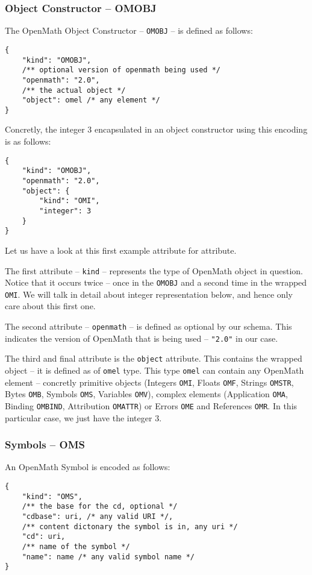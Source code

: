 \subsubsection{Object Constructor -- OMOBJ}

The OpenMath Object Constructor -- \texttt{OMOBJ} -- is defined as follows:
\begin{lstlisting}
{
    "kind": "OMOBJ",
    /** optional version of openmath being used */
    "openmath": "2.0",
    /** the actual object */
    "object": omel /* any element */
}
\end{lstlisting}
Concretly, the integer 3 encapsulated in an object constructor using this encoding is as follows:
\begin{lstlisting}
{
    "kind": "OMOBJ",
    "openmath": "2.0",
    "object": {
        "kind": "OMI", 
        "integer": 3
    }
}
\end{lstlisting}

Let us have a look at this first example attribute for attribute. 

The first attribute -- \texttt{kind} -- represents the type of OpenMath object in question. 
Notice that it occurs twice -- once in the \texttt{OMOBJ} and a second time in the wrapped \texttt{OMI}. 
We will talk in detail about integer representation below, and hence only care about this first one. 

The second attribute -- \texttt{openmath} -- is defined as optional by our schema. 
This indicates the version of OpenMath that is being used -- \lstinline{"2.0"} in our case. 

The third and final attribute is the \texttt{object} attribute. 
This contains the wrapped object -- it is defined as of \texttt{omel} type. 
This type \texttt{omel} can contain any OpenMath element -- concretly
primitive objects (Integers \texttt{OMI}, Floats \texttt{OMF}, Strings \texttt{OMSTR}, Bytes \texttt{OMB}, Symbols \texttt{OMS}, Variables \texttt{OMV}), 
complex elements (Application \texttt{OMA}, Binding \texttt{OMBIND}, Attribution \texttt{OMATTR}) or
Errors \texttt{OME} and References \texttt{OMR}. 
In this particular case, we just have the integer $3$. 

\subsubsection{Symbols -- OMS}

An OpenMath Symbol is encoded as follows:
\begin{lstlisting}
{
    "kind": "OMS",
    /** the base for the cd, optional */
    "cdbase": uri, /* any valid URI */, 
    /** content dictonary the symbol is in, any uri */
    "cd": uri,
    /** name of the symbol */
    "name": name /* any valid symbol name */
}
\end{lstlisting}

